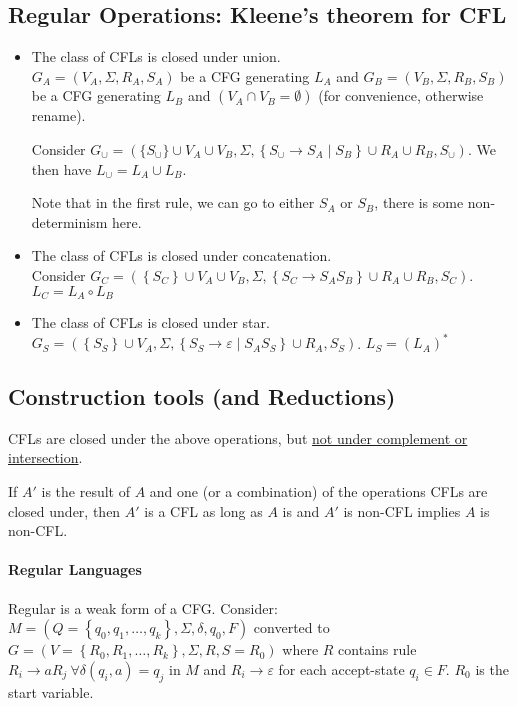 \documentclass[12 pt]{article}
\begin{document}
\subsection{Regular Operations: Kleene's theorem for CFL}
\begin{itemize}
\item
The class of CFLs is closed under union.
\\
$G_A = (V_A, \Sigma, R_A, S_A)$ be a CFG generating $L_A$ and
$G_B = (V_B, \Sigma, R_B, S_B)$ be a CFG generating $L_B$ and $(V_A
\cap V_B = \emptyset)$ (for convenience, otherwise rename).

Consider $G_\cup = (\{S_\cup\}\cup V_A \cup V_B, \Sigma, \left\{S_\cup
\to S_A \mid S_B\right\} \cup R_A \cup R_B, S_\cup)$. We then have
$L_\cup = L_A \cup L_B$.

Note that in the first rule, we can go to either $S_A$ or $S_B$, there
is some non-determinism here.
\item
The class of CFLs is closed under concatenation.
\\
Consider $G_C = ( \left\{S_C\right\}\cup V_A \cup V_B, \Sigma,
\left\{S_C \to S_AS_B\right\}\cup R_A \cup R_B, S_C)$. $L_C = L_A
\circ L_B$
\item
The class of CFLs is closed under star.
\\
$G_S = ( \left\{S_S\right\}\cup V_A, \Sigma, \left\{S_S \to
  \varepsilon \mid S_A S_S\right\} \cup R_A, S_S)$. $L_S = (L_A)^*$
\end{itemize}
\subsection{Construction tools (and Reductions)}
CFLs are closed under the above operations, but \underline{not under
  complement or intersection}.

If $A'$ is the result of $A$ and one (or a combination) of the operations CFLs are closed
under, then $A'$ is a CFL as long as $A$ is and $A'$ is non-CFL
implies $A$ is non-CFL.

\paragraph{Regular Languages}
Regular is a weak form of a CFG. Consider: $M = (Q= \left\{q_0, q_1,
  \ldots, q_k\right\}, \Sigma, \delta, q_0, F)$ converted to $G = (V =
\left\{R_0,R_1, \ldots, R_k\right\}, \Sigma, R, S=R_0)$ where $R$
contains rule $R_i \to aR_j\ \forall \delta(q_i,a) = q_j$ in $M$ and
$R_i \to \varepsilon$ for each accept-state $q_i \in F$. $R_0$ is
the start variable.
\end{document}
